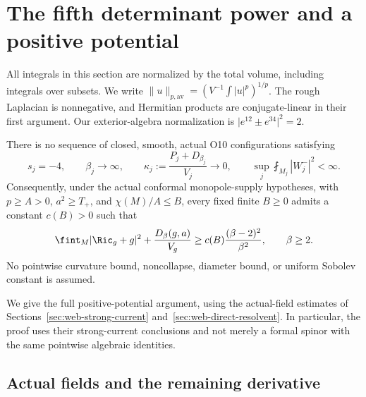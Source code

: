 
\section{The fifth determinant power and a positive potential}
\label{sec:web-positive-potential}

All integrals in this section are normalized by the total volume, including
integrals over subsets.  We write
\(\|u\|_{p,\mathrm{av}}=(V^{-1}\int |u|^p)^{1/p}\).
The rough Laplacian is nonnegative, and Hermitian products are conjugate-linear
in their first argument.  Our exterior-algebra normalization is
\(\lvert e^{12}\pm e^{34}\rvert^2=2\).

\begin{theorem}
\label{thm:web-pp-exclusion}
There is no sequence of closed, smooth, actual O10 configurations satisfying
\[
 s_j=-4,\qquad \beta_j\longrightarrow\infty,\qquad
 \kappa_j:=\frac{P_j+D_{\beta_j}}{V_j}\longrightarrow0,
 \qquad \sup_j\fint_{M_j}|W_j^-|^2<\infty.
\]
Consequently, under the actual conformal monopole-supply hypotheses, with
\(p\ge A>0\), \(a^2\ge T_+\), and \(\chi(M)/A\le B\), every fixed
finite \(B\ge0\) admits a constant \(c(B)>0\) such that
\begin{equation}
 \fint_M|\Ric_g+g|^2+\frac{D_\beta(g,a)}{V_g}
 \ge c(B)\frac{(\beta-2)^2}{\beta^2},\qquad \beta\ge2.
 \label{eq:web-pp-finite-density}
\end{equation}
No pointwise curvature bound, noncollapse, diameter bound, or uniform Sobolev
constant is assumed.
\end{theorem}

We give the full positive-potential argument, using the actual-field estimates
of Sections~\ref{sec:web-strong-current} and~\ref{sec:web-direct-resolvent}.
In particular, the proof uses their strong-current conclusions and not merely
a formal spinor with the same pointwise algebraic identities.

\subsection{Actual fields and the remaining derivative}

